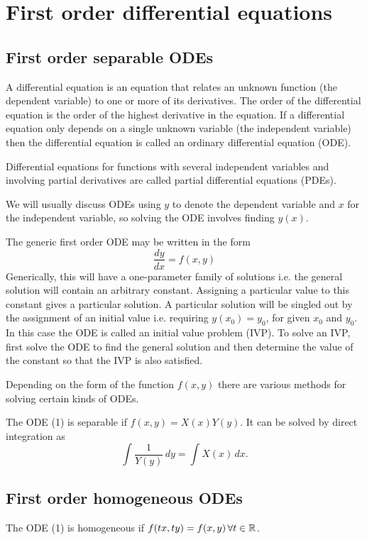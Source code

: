 \documentclass[10pt, a4paper]{article}
\begin{document}
\newpage

\section{First order differential equations}

\subsection{First order separable ODEs}

A differential equation is an equation that relates an unknown function
(the dependent variable)
to one or more of its derivatives.
The order of the differential equation is the order of the highest derivative in the equation.
If a differential equation only depends on a single unknown variable
(the independent variable)
then the differential equation is called an ordinary differential equation
(ODE).

Differential equations for functions with several independent variables and involving partial derivatives are called partial differential equations
(PDEs).

We will usually discuss ODEs using $y$ to denote the dependent variable and $x$ for the independent variable,
so solving the ODE involves finding $y(x)$.

The generic first order ODE may be written in the form
\begin{equation}
    \frac{dy}{dx} = f(x, y)
\end{equation}
Generically,
this will have a one-parameter family of solutions i.e. the general solution will contain an arbitrary constant.
Assigning a particular value to this constant gives a particular solution.
A particular solution will be singled out by the assignment of an initial value i.e. requiring $y(x_0) = y_0$,
for given $x_0$ and $y_0$.
In this case the ODE is called an initial value problem (IVP).
To solve an IVP,
first solve the ODE to find the general solution and then determine the value of the constant so that the IVP is also satisfied.

Depending on the form of the function $f(x, y)$ there are various methods for solving certain kinds of ODEs.

The ODE (1) is separable if $f(x, y) = X(x)Y(y)$.
It can be solved by direct integration as
\[
\int\frac{1}{Y(y)}\,dy = \int X(x)\,dx.
\]

\subsection{First order homogeneous ODEs}
The ODE (1) is homogeneous if $f(tx, ty) = f(x, y)\,\forall t \in \mathbb{R}$.
\end{document}
